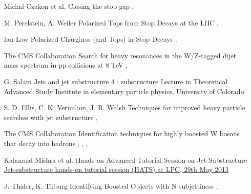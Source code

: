 {Michal Czakon et al.}
{Closing the stop gap}
{, }

{M. Perelstein, A. Weiler}
{Polarized Tops from Stop Decays at the LHC}
{, }

{Ian Low}
{Polarized Charginos (and Tops) in Stop Decays}
{, }


{The CMS Collaboration}
{Search for heavy resonances in the W/Z-tagged dijet mass
spectrum in pp collisions at 8 TeV}
{, }

{G. Salam}
{Jets and jet substructure 4 : substructure}
{Lecture in Theoretical Advanced Study Institute in elementary particle physics,
University of Colorado}

{S. D. Ellis, C. K. Vermilion, J. R. Walsh}
{Techniques for improved heavy particle searches with jet substructure}
{, }

{The CMS Collaboration}
{Identification techniques for highly boosted W bosons that decay into hadrons}
{, , , }

{Kalanand Mishra et al.}
{Hands-on Advanced Tutorial Session on Jet Substructure}
{\href{https://twiki.cern.ch/twiki/pub/CMSPublic/SWGuideHATSJetSubstructure/JS_HATS_intro.pdf}{Jet-substructure hands-on tutorial session (HATS) at LPC, 29th May 2013}}

{J. Thaler, K. Tilburg}
{Identifying Boosted Objects with N-subjettiness}
{, }



